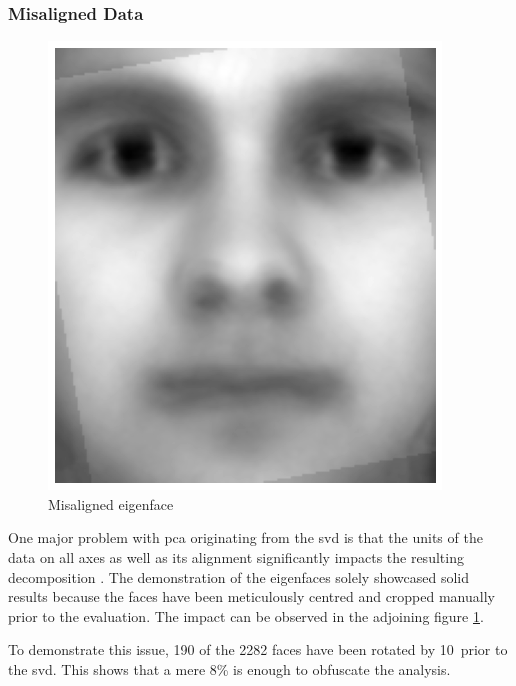 \subsubsection{Misaligned Data}


\begin{figure}
    \centering
    \includegraphics[width=0.9\linewidth]{external_content/media/rotation/average_face-rotation.png}
    \captionsetup{justification=centering}
    \caption{Misaligned eigenface}
    \label{fig:misalignedEigenface}
\end{figure}

One major problem with \gls{pca} originating from the \gls{svd} is that the units of the data on all axes as well as its alignment significantly impacts the resulting decomposition \cite{brunton2019data}.
The demonstration of the eigenfaces solely showcased solid results because the faces have been meticulously centred and cropped manually prior to the evaluation.
The impact can be observed in the adjoining figure \ref{fig:misalignedEigenface}.

To demonstrate this issue, 190 of the 2282 faces have been rotated by 10\textdegree\ prior to the \gls{svd}.
This shows that a mere 8\% is enough to obfuscate the analysis.



